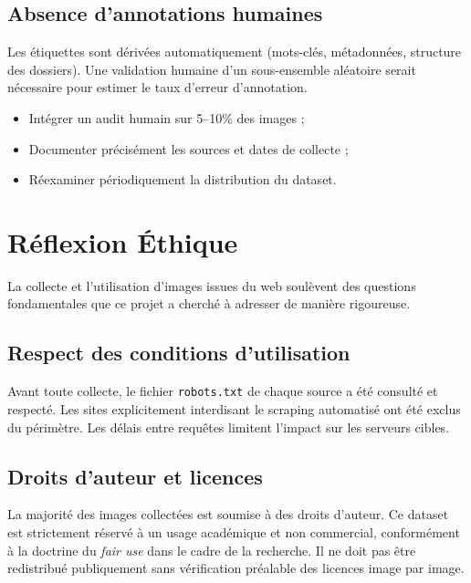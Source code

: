 \documentclass[12pt,a4paper]{article}
\begin{document}
\subsection{Absence d'annotations humaines}

Les étiquettes sont dérivées automatiquement (mots-clés, métadonnées, structure des
dossiers). Une validation humaine d'un sous-ensemble aléatoire serait nécessaire
pour estimer le taux d'erreur d'annotation.

\begin{warnbox}[Recommandations]
\begin{itemize}[noitemsep]
  \item Intégrer un audit humain sur 5--10\% des images ;
  \item Documenter précisément les sources et dates de collecte ;
  \item Réexaminer périodiquement la distribution du dataset.
\end{itemize}
\end{warnbox}

\section{Réflexion Éthique}

\begin{ethicbox}
La collecte et l'utilisation d'images issues du web soulèvent des questions
fondamentales que ce projet a cherché à adresser de manière rigoureuse.
\end{ethicbox}

\subsection{Respect des conditions d'utilisation}

Avant toute collecte, le fichier \texttt{robots.txt} de chaque source a été
consulté et respecté. Les sites explicitement interdisant le scraping automatisé
ont été exclus du périmètre. Les délais entre requêtes limitent l'impact sur les
serveurs cibles.

\subsection{Droits d'auteur et licences}

La majorité des images collectées est soumise à des droits d'auteur. Ce dataset
est strictement réservé à un usage académique et non commercial, conformément à la
doctrine du \textit{fair use} dans le cadre de la recherche. Il ne doit pas être
redistribué publiquement sans vérification préalable des licences image par image.
\end{document}
